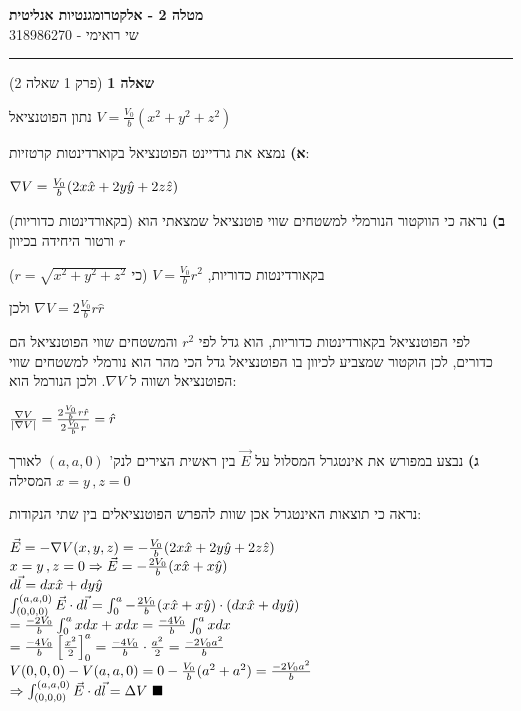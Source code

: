 \documentclass[14pt]{extarticle}
\makeatletter
\newenvironment{lefteqs}{%
    \begin{english}%
    \begin{flushleft}%
    \renewcommand{\arraystretch}{1.3}%
    $\begin{array}{@{}l@{}}%
}{%
    \end{array}$%
    \end{flushleft}%
    \end{english}%
}
\makeatother
\begin{document}
\begin{center}
    {\LARGE \textbf{מטלה 2 - אלקטרומגנטיות אנליטית}}\\[0.5em]
    {\large שי רואימי - 318986270}\\[0.3em]
\end{center}

\hrule
\vspace{2em}

\textbf{\large שאלה 1}
(פרק 1 שאלה 2)

נתון הפוטנציאל $V=\frac{V_0}{b} (x^2 + y^2 + z^2)$

\textbf{א)} 
נמצא את גרדיינט הפוטנציאל בקוארדינטות קרטזיות:

\begin{lefteqs}
    \nabla V = \frac{V_0}{b} (2x \hat{x} + 2y \hat{y} + 2z \hat{z})
\end{lefteqs}

\textbf{ב)}
נראה כי הווקטור הנורמלי למשטחים שווי פוטנציאל שמצאתי הוא (בקאורדינטות כדוריות) ורטור היחידה בכיוון $r$

בקאורדינטות כדוריות, $V=\frac{V_0}{b} r^2$ (כי $r=\sqrt{x^2+y^2+z^2}$)

ולכן $\nabla V = 2\frac{V_0}{b} r \hat{r}$

לפי הפוטנציאל בקאורדינטות כדוריות, הוא גדל לפי $r^2$ והמשטחים שווי הפוטנציאל הם כדורים,
לכן הוקטור שמצביע לכיוון בו הפוטנציאל גדל הכי מהר הוא נורמלי למשטחים שווי הפוטנציאל ושווה ל $\nabla V$.
 ולכן הנורמל הוא:

 \begin{lefteqs}
    \frac{\nabla V}{|\nabla V|} = \frac{2\frac{V_0}{b} r \hat{r}}{2\frac{V_0}{b} r} = \hat{r}
 \end{lefteqs}

\textbf{ג)}
נבצע במפורש את אינטגרל המסלול על $\vec{E}$ בין ראשית הצירים לנק' $(a,a,0)$
לאורך המסילה $x=y \, , z=0$

נראה כי תוצאות האינטגרל אכן שוות להפרש הפוטנציאלים בין שתי הנקודות:

\begin{lefteqs}
    \vec{E} = -\nabla V(x,y,z) = -\frac{V_0}{b} (2x \hat{x} + 2y \hat{y} + 2z \hat{z}) \\
    x=y \, , z=0 \Rightarrow \vec{E} = -\frac{2V_0}{b} (x \hat{x} + x \hat{y}) \\
    d\vec{l} = dx\hat{x} + dy\hat{y} \\
    \int_{(0,0,0)}^{(a,a,0)} \vec{E} \cdot d\vec{l} = \int_{0}^{a} -\frac{2V_0}{b} (x \hat{x} + x \hat{y}) \cdot (dx\hat{x} + dy\hat{y}) \\
    = \frac{-2V_0}{b} \int_{0}^{a} xdx + xdx = \frac{-4V_0}{b} \int_{0}^{a} xdx \\
    = \frac{-4V_0}{b} \left[ \frac{x^2}{2} \right]_{0}^{a} = \frac{-4V_0}{b} \cdot \frac{a^2}{2} = \frac{-2V_0 a^2}{b} \\
    V(0,0,0) - V(a,a,0) = 0 - \frac{V_0}{b} (a^2 + a^2) = \frac{-2V_0 a^2}{b} \\
    \Rightarrow \int_{(0,0,0)}^{(a,a,0)} \vec{E} \cdot d\vec{l} = \Delta V \, \, \blacksquare
\end{lefteqs}
\end{document}
